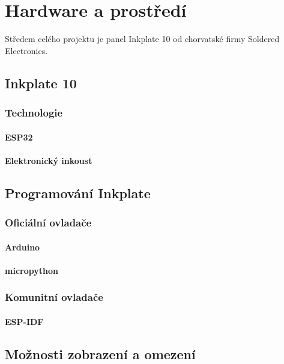 \chapter{Hardware a prostředí}

Středem celého projektu je panel Inkplate 10 od chorvatské firmy Soldered Electronics.

\section{Inkplate 10}
\subsection{Technologie}
    \subsubsection{ESP32}
    \subsubsection{Elektronický inkoust}

\section{Programování Inkplate}
\subsection{Oficiální ovladače}
    \subsubsection{Arduino}
    \subsubsection{micropython}
\subsection{Komunitní ovladače}
    \subsubsection{ESP-IDF}

\section{Možnosti zobrazení a omezení}